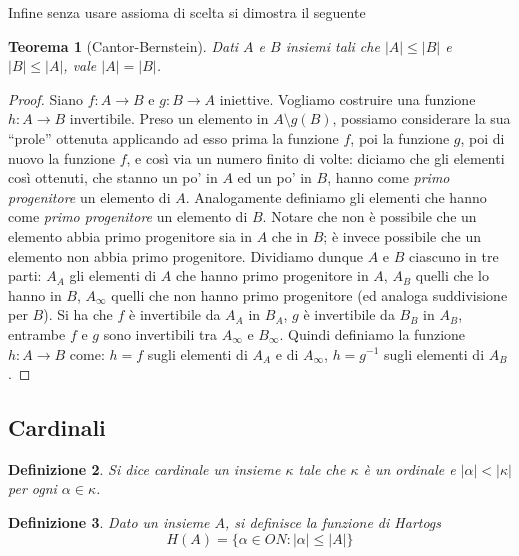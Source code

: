 \documentclass[a4paper,10pt,oneside]{article}
\newcommand{\myname}[1]{\emph{#1}}
\newcommand{\abs}[1]{\left|#1\right|}
\theoremstyle{plain}
\newtheorem{mytheorem}{Teorema}[section]
\newtheorem{mydef}[mytheorem]{Definizione}
\theoremstyle{definition}
\theoremstyle{remark}
\begin{document}
Infine senza usare assioma di scelta si dimostra il seguente

\begin{mytheorem}[Cantor-Bernstein]
 Dati $A$ e $B$ insiemi tali che $\abs A\le\abs B$ e $\abs B\le\abs A$, vale $\abs A=\abs B$.
\end{mytheorem}
\begin{proof}
 Siano $f:A\rightarrow B$ e $g:B\rightarrow A$ iniettive.
 Vogliamo costruire una funzione $h:A\rightarrow B$ invertibile.
 Preso un elemento in $A\setminus g(B)$, possiamo considerare la sua ``prole'' ottenuta applicando ad esso prima la funzione $f$, poi la funzione $g$, poi di nuovo la funzione $f$, e così via un numero finito di volte: diciamo che gli elementi così ottenuti, che stanno un po' in $A$ ed un po' in $B$, hanno come \myname{primo progenitore} un elemento di $A$. Analogamente definiamo gli elementi che hanno come \myname{primo progenitore} un elemento di $B$. Notare che non è possibile che un elemento abbia primo progenitore sia in $A$ che in $B$; è invece possibile che un elemento non abbia primo progenitore.
 Dividiamo dunque $A$ e $B$ ciascuno in tre parti: $A_A$ gli elementi di $A$ che hanno primo progenitore in $A$, $A_B$ quelli che lo hanno in $B$, $A_{\infty}$ quelli che non hanno primo progenitore (ed analoga suddivisione per $B$). 
 Si ha che $f$ è invertibile da $A_A$ in $B_A$, $g$ è invertibile da $B_B$ in $A_B$, entrambe $f$ e $g$ sono invertibili tra $A_{\infty}$ e $B_{\infty}$. Quindi definiamo la funzione $h:A\rightarrow B$ come: $h=f$ sugli elementi di $A_A$ e di $A_{\infty}$, $h=g^{-1}$ sugli elementi di $A_B$.
\end{proof}



\subsection{Cardinali}

\begin{mydef}
 Si dice \myname{cardinale} un insieme $\kappa$ tale che $\kappa$ è un ordinale e $\abs\alpha < \abs\kappa$ per ogni $\alpha\in\kappa$.
\end{mydef}



\begin{mydef}
 Dato un insieme $A$, si definisce la funzione di Hartogs \[H(A)=\{\alpha \in ON:\abs\alpha\le\abs A\}\]
\end{mydef}
\end{document}
